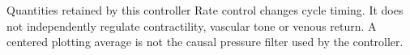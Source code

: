 \documentclass[aspectratio=169,11pt]{beamer}
\newcommand{\notestarget}{notes.pdf}\newcommand{\noteslabel}{Notes}
\begin{document}
\renewcommand{\notestarget}{notes.pdf\#note-equilibrium-offsets-and-numerical-sensitivity}
\begin{frame}[t,fragile,label=slide-quantities-retained-by-this-controller]{Quantities retained by this controller}
Rate control changes cycle timing. It does not independently regulate contractility, vascular tone or venous return.\pause{} A centered plotting average is not the causal pressure filter used by the controller.
\end{frame}
\end{document}
